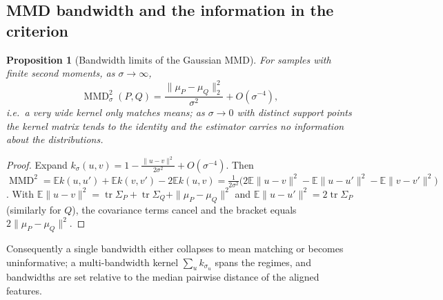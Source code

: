 \documentclass[journal]{IEEEtran}
\newtheorem{proposition}{Proposition}
\newcommand{\E}{\mathbb{E}}
\newcommand{\1}{\mathbf{1}}
\DeclareMathOperator{\MMD}{MMD}
\begin{document}
\subsection{MMD bandwidth and the information in the criterion}
\begin{proposition}[Bandwidth limits of the Gaussian MMD]\label{prop:mmdbw}
For samples with finite second moments, as $\sigma\to\infty$,
\begin{equation}
\MMD^2_\sigma(P,Q)=\frac{\|\mu_P-\mu_Q\|_2^2}{\sigma^2}+O(\sigma^{-4}),
\end{equation}
i.e.\ a very wide kernel only matches means; as $\sigma\to0$ with distinct support points the kernel matrix tends to the identity and the estimator carries no information about the distributions.
\end{proposition}
\begin{proof}
Expand $k_\sigma(u,v)=1-\tfrac{\|u-v\|^2}{2\sigma^2}+O(\sigma^{-4})$. Then $\MMD^2=\E k(u,u')+\E k(v,v')-2\E k(u,v)=\tfrac1{2\sigma^2}\big(2\E\|u-v\|^2-\E\|u-u'\|^2-\E\|v-v'\|^2\big)$. With $\E\|u-v\|^2=\operatorname{tr}\Sigma_P+\operatorname{tr}\Sigma_Q+\|\mu_P-\mu_Q\|^2$ and $\E\|u-u'\|^2=2\operatorname{tr}\Sigma_P$ (similarly for $Q$), the covariance terms cancel and the bracket equals $2\|\mu_P-\mu_Q\|^2$. \end{proof}
\noindent Consequently a single bandwidth either collapses to mean matching or becomes uninformative; a multi-bandwidth kernel $\sum_u k_{\sigma_u}$ \cite{long2015dan} spans the regimes, and bandwidths are set relative to the median pairwise distance of the aligned features.
\end{document}

